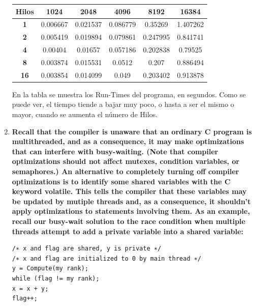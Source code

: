 \documentclass[a4paper,12pt]{article}
\begin{document}
\begin{enumerate}
\begin{center}
\begin{tabular}{|c|c|c|c|c|c|}\hline
\textbf{Hilos} & \textbf{1024} & \textbf{2048} & \textbf{4096} & \textbf{8192} & \textbf{16384}\\\hline
\textbf{1} & 0.006667 & 0.021537 & 0.086779 & 0.35269 & 1.407262\\\hline
\textbf{2} & 0.005419 & 0.019894 & 0.079861 & 0.247995 & 0.841741\\\hline
\textbf{4} & 0.00404 & 0.01657 & 0.057186 & 0.202838 & 0.79525\\\hline
\textbf{8} & 0.003874 & 0.015531 & 0.0512 & 0.207 & 0.886494\\\hline
\textbf{16} & 0.003854 & 0.014099 & 0.049 & 0.203402 & 0.913878\\\hline
\end{tabular}
\end{center}

En la tabla se muestra los Run-Times del programa, en segundos. Como se puede ver, el tiempo tiende a bajar muy poco, o hasta
a ser el mismo o mayor, cuando se aumenta el número de Hilos.

\item{ \textbf{Recall that the compiler is unaware that an ordinary C program is multithreaded, and as a consequence,
it may make optimizations that can interfere with busy-waiting. (Note that compiler optimizations should not affect
mutexes, condition variables, or semaphores.) An alternative to completely turning off compiler optimizations is to
identify some shared variables with the C keyword volatile. This tells the compiler that these variables may be
updated by mutiple threads and, as a consequence, it shouldn’t apply optimizations to statements involving them.
As an example, recall our busy-wait solution to the race condition when multiple threads attempt to add a private
variable into a shared variable:}

\begin{lstlisting}
/∗ x and flag are shared, y is private ∗/
/∗ x and flag are initialized to 0 by main thread ∗/
y = Compute(my rank);
while (flag != my rank);
x = x + y;
flag++;
\end{lstlisting}


}
\end{enumerate}
\end{document}
